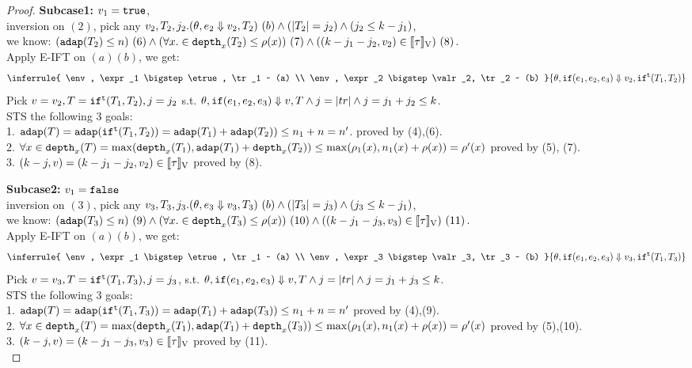 \documentclass[a4paper,11pt]{article}
\theoremstyle{definition}
\begin{document}
\begin{proof}
{\bf Subcase1:} $v_1 = \mathtt{true}$, \\
%
inversion on $(2)$, pick any $v_2, T_2, j_2. (\theta, e_2 \mathrel{\Downarrow} v_2, T_2) ~ (b) \land (|T_2| = j_2) \land (j_2 \leq k-j_1)$,\\
%
we know: $(\mathtt{adap}(T_2) \leq n)~(6) \land (\forall x. \in \mathtt{depth}_{x}(T_2) \leq \rho(x))~(7) \land ((k - j_1-j_2, v_2) \in [\![ \tau ]\!]_{\text{V}})~(8)$.\\
%
Apply E-IFT on $(a) (b)$, we get:
\[
  \inferrule{
    \env, \expr_1 \bigstep \etrue, \tr_1 ~ (a) \\
    \env, \expr_2 \bigstep \valr_2, \tr_2 ~ (b)
  }{
    \env, \eif(\expr_1, \expr_2, \expr_3) \bigstep \valr_2, \trift(\tr_1, \tr_2)
  }
\]
Pick $v = v_2, T = \mathtt{if}^{\mathtt{t}}(T_1, T_2), j = j_2$ s.t. $
\theta, \mathtt{if}(e_1, e_2, e_3) \mathrel{\Downarrow} v, T \land j =
|tr| \land j = j_1 + j_2 \leq k$.\\
 STS the following 3 goals:\\
%
1. $\mathtt{adap}(T) = \mathtt{adap}(\mathtt{if}^{\mathtt{t}}(T_1, T_2)) = \mathtt{adap}(T_1) +
\mathtt{adap}(T_2)) \leq n_1 + n = n'$. proved by (4),(6).\\
%
2. $\forall x \in \mathtt{depth}_{x}(T) = \max(\mathtt{depth}_{x}(T_1), \mathtt{adap}(T_1) +
\mathtt{depth}_{x}(T_2)) \leq \max(\rho_1(x), n_1(x) + \rho(x)) =
\rho'(x)  $ proved by (5), (7).\\
%
3. $(k - j, v) = (k -j_1- j_2, v_2) \in
[\![ \tau ]\!]_{\text{V}}$ proved by (8).

{\bf Subcase2:} $v_1 = \mathtt{false}$\\
%
inversion on $(3)$, pick any $v_3, T_3, j_3. (\theta, e_3 \mathrel{\Downarrow} v_3, T_3) ~ (b) \land (|T_3| = j_3) \land (j_3 \leq k-j_1)$,\\
%
we know: $(\mathtt{adap}(T_3) \leq n) ~(9) \land (\forall x. \in \mathtt{depth}_{x}(T_3) \leq \rho(x))~(10) \land ((k -j_1- j_3, v_3) \in [\![ \tau ]\!]_{\text{V}})~(11)$.\\
%
Apply E-IFT on $(a) (b)$, we get:
\[
  \inferrule{
    \env, \expr_1 \bigstep \etrue, \tr_1 ~ (a) \\
    \env, \expr_3 \bigstep \valr_3, \tr_3 ~ (b)
  }{
    \env, \eif(\expr_1, \expr_2, \expr_3) \bigstep \valr_3, \trift(\tr_1, \tr_3)
  }
\]
Pick $v = v_3, T = \mathtt{if}^{\mathtt{t}}(T_1, T_3), j = j_3$,  s.t. $
\theta, \mathtt{if}(e_1, e_2, e_3) \mathrel{\Downarrow} v, T \land j =
|tr| \land j = j_1 + j_3 \leq k$.\\
 STS the following 3 goals:\\
%
1. $\mathtt{adap}(T) = \mathtt{adap}(\mathtt{if}^{\mathtt{t}}(T_1, T_3)) = \mathtt{adap}(T_1) +
\mathtt{adap}(T_3)) \leq n_1 + n = n'$  proved by (4),(9).\\
%
2. $\forall x \in \mathtt{depth}_{x}(T) = \max(\mathtt{depth}_{x}(T_1), \mathtt{adap}(T_1) +
\mathtt{depth}_{x}(T_3)) \leq \max(\rho_1(x), n_1(x) + \rho(x)) =
\rho'(x) $ proved by (5),(10).\\
%
3. $(k - j, v) = (k - j_1-j_3, v_3) \in
[\![ \tau ]\!]_{\text{V}} $ proved by (11).\\




\end{proof}
\end{document}
